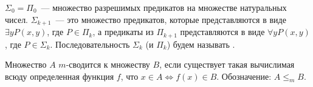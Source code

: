 





\setcounter{curtask}{29}

\begin{definition*}
    $\Sigma_0 = \Pi_0$~--- множество разрешимых предикатов на множестве натуральных чисел.
    $\Sigma_{k + 1}$~--- это множество предикатов, которые представляются в виде $\exists y P(x, y)$, где
    $P \in \Pi_{k}$, а предикаты из $\Pi_{k + 1}$ представляются в виде $\forall y P(x, y)$, где $P \in
    \Sigma_{k}$. Последовательность $\Sigma_k$ (и $\Pi_k$) будем называть .
\end{definition*}


\begin{definition*}
    Множество $A$ $m$-сводится к множеству $B$, если существует такая вычислимая всюду определенная
    функция $f$, что $x \in A \Leftrightarrow f(x) \in B$. Обозначение: $A \le_m B$.
\end{definition*}



\breakline









